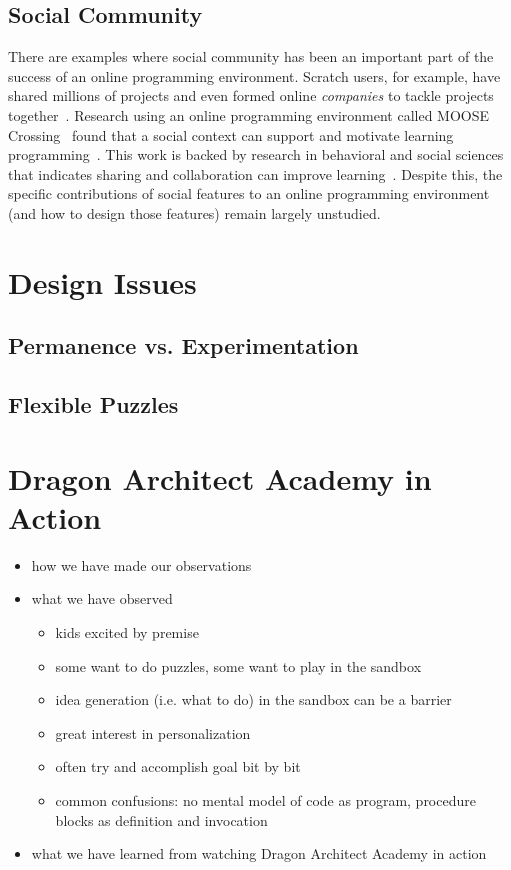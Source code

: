 \documentclass{sig-alternate}
\newcommand{\gametitle}{{\color{RoyalPurple} Dragon Architect Academy}}
\begin{document}
\subsection{Social Community}
There are examples where social community has been an important part of the success of an online programming environment. 
Scratch users, for example, have shared millions of projects and even formed online \emph{companies} to tackle projects together~\cite{resnik2009scratch}. 
Research using an online programming environment called MOOSE Crossing~\cite{bruckman1997moose} found that a social context can support and motivate learning programming~\cite{bruckman2000situated}.
This work is backed by research in behavioral and social sciences that indicates sharing and collaboration can improve learning~\cite{branford2000people}. 
Despite this, the specific contributions of social features to an online programming environment (and how to design those features) remain largely unstudied.



\section{Design Issues}

\subsection{Permanence vs. Experimentation}

\subsection{Flexible Puzzles}


\section{\gametitle{} in Action}
\label{sec:action}
\begin{itemize}
\item how we have made our observations
\item what we have observed
\begin{itemize}
\item kids excited by premise
\item some want to do puzzles, some want to play in the sandbox
\item idea generation (i.e. what to do) in the sandbox can be a barrier
\item great interest in personalization
\item often try and accomplish goal bit by bit
\item common confusions: no mental model of code as program, procedure blocks as definition and invocation
\end{itemize}

\item what we have learned from watching \gametitle{} in action
\end{itemize}
\end{document}
